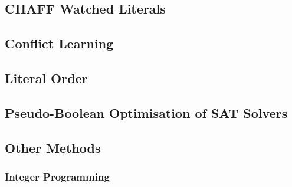 \subsection{CHAFF Watched Literals}

\subsection{Conflict Learning}



\subsection{Literal Order}


\subsection{Pseudo-Boolean Optimisation of SAT Solvers}



\subsection{Other Methods}
\subsubsection{Integer Programming}
